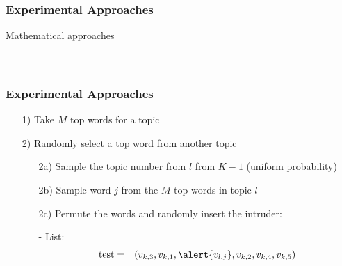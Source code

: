\documentclass{beamer}
\numberwithin{equation}{section}
\begin{document}
\begin{frame}
\frametitle{Experimental Approaches}

Mathematical approaches\pause {} \pause \\
 \pause \\
 \pause \\

 \pause

\begin{itemize}
 \pause
{}
\end{itemize}


\end{frame}

\begin{frame}
\frametitle{Experimental Approaches}


\begin{itemize}
\item[1)] Take $M$ top words for a topic
\item[2)] Randomly select a top word from another topic
\begin{itemize}
\item[2a)] Sample the topic number from $l$ from $K-1$ (uniform probability)
\item[2b)] Sample word $j$ from the $M$ top words in topic $l$
\item[2c)] Permute the words and randomly insert the \alert{intruder}:
\item[-] List:
\begin{eqnarray}
\text{test} &  =  & (v_{k, 3}, v_{k, 1}, \alert{v_{l, j}}, v_{k, 2}, v_{k, 4}, v_{k,5}) \nonumber
\end{eqnarray}
\end{itemize}
\end{itemize}




\end{frame}
\end{document}
